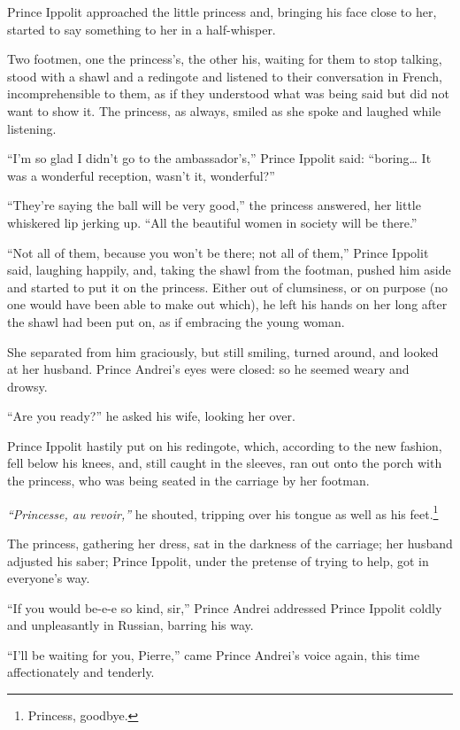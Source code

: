 Prince Ippolit approached the little princess and, bringing his face
close to her, started to say something to her in a half-whisper.

Two footmen, one the princess's, the other his, waiting for them to
stop talking, stood with a shawl and a redingote and listened to their
conversation in French, incomprehensible to them, as if they
understood what was being said but did not want to show it. The
princess, as always, smiled as she spoke and laughed while listening.

``I'm so glad I didn't go to the ambassador's,'' Prince Ippolit said:
``boring\ldots{} It was a wonderful reception, wasn't it, wonderful?''

``They're saying the ball will be very good,'' the princess answered,
her little whiskered lip jerking up. ``All the beautiful women in
society will be there.''

``Not all of them, because you won't be there; not all of them,''
Prince Ippolit said, laughing happily, and, taking the shawl from the
footman, pushed him aside and started to put it on the
princess. Either out of clumsiness, or on purpose (no one would have
been able to make out which), he left his hands on her long after the
shawl had been put on, as if embracing the young woman.

She separated from him graciously, but still smiling, turned around,
and looked at her husband. Prince Andrei's eyes were closed: so he
seemed weary and drowsy.

``Are you ready?'' he asked his wife, looking her over.

Prince Ippolit hastily put on his redingote, which, according to the
new fashion, fell below his knees, and, still caught in the sleeves,
ran out onto the porch with the princess, who was being seated in the
carriage by her footman.

\textit{``Princesse, au revoir,''} he shouted, tripping over his
tongue as well as his feet.\footnote{Princess, goodbye.}

The princess, gathering her dress, sat in the darkness of the
carriage; her husband adjusted his saber; Prince Ippolit, under the
pretense of trying to help, got in everyone's way.

``If you would be-e-e so kind, sir,'' Prince Andrei addressed Prince
Ippolit coldly and unpleasantly in Russian, barring his way.

``I'll be waiting for you, Pierre,'' came Prince Andrei's voice again,
this time affectionately and tenderly.

